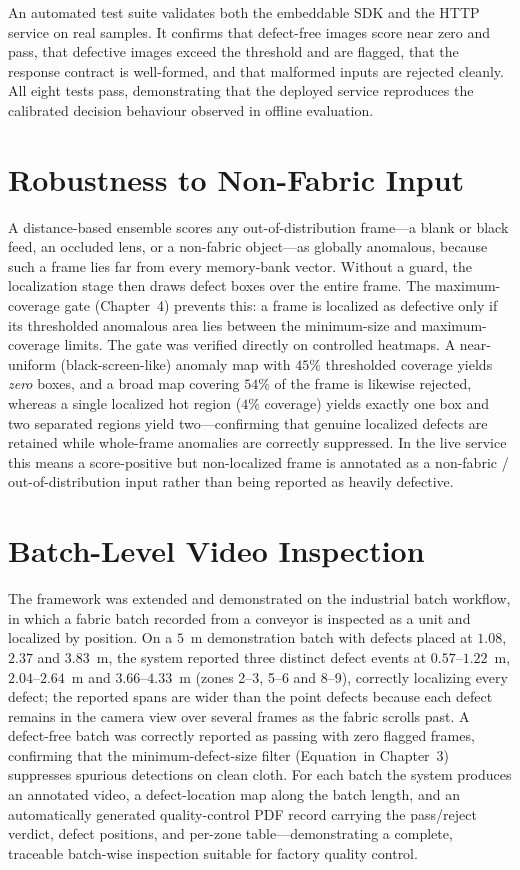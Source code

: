 An automated test suite validates both the embeddable SDK and the HTTP service on real samples. It confirms that defect-free images score near zero and pass, that defective images exceed the threshold and are flagged, that the response contract is well-formed, and that malformed inputs are rejected cleanly. All eight tests pass, demonstrating that the deployed service reproduces the calibrated decision behaviour observed in offline evaluation.

\section{Robustness to Non-Fabric Input}

A distance-based ensemble scores any out-of-distribution frame---a blank or black feed, an occluded lens, or a non-fabric object---as globally anomalous, because such a frame lies far from every memory-bank vector. Without a guard, the localization stage then draws defect boxes over the entire frame. The maximum-coverage gate (Chapter~4) prevents this: a frame is localized as defective only if its thresholded anomalous area lies between the minimum-size and maximum-coverage limits. The gate was verified directly on controlled heatmaps. A near-uniform (black-screen-like) anomaly map with $45\%$ thresholded coverage yields \emph{zero} boxes, and a broad map covering $54\%$ of the frame is likewise rejected, whereas a single localized hot region ($4\%$ coverage) yields exactly one box and two separated regions yield two---confirming that genuine localized defects are retained while whole-frame anomalies are correctly suppressed. In the live service this means a score-positive but non-localized frame is annotated as a non-fabric / out-of-distribution input rather than being reported as heavily defective.

\section{Batch-Level Video Inspection}

The framework was extended and demonstrated on the industrial batch workflow, in which a fabric batch recorded from a conveyor is inspected as a unit and localized by position. On a $5$~m demonstration batch with defects placed at $1.08$, $2.37$ and $3.83$~m, the system reported three distinct defect events at $0.57$--$1.22$~m, $2.04$--$2.64$~m and $3.66$--$4.33$~m (zones 2--3, 5--6 and 8--9), correctly localizing every defect; the reported spans are wider than the point defects because each defect remains in the camera view over several frames as the fabric scrolls past. A defect-free batch was correctly reported as passing with zero flagged frames, confirming that the minimum-defect-size filter (Equation~in Chapter~3) suppresses spurious detections on clean cloth. For each batch the system produces an annotated video, a defect-location map along the batch length, and an automatically generated quality-control PDF record carrying the pass/reject verdict, defect positions, and per-zone table---demonstrating a complete, traceable batch-wise inspection suitable for factory quality control.

